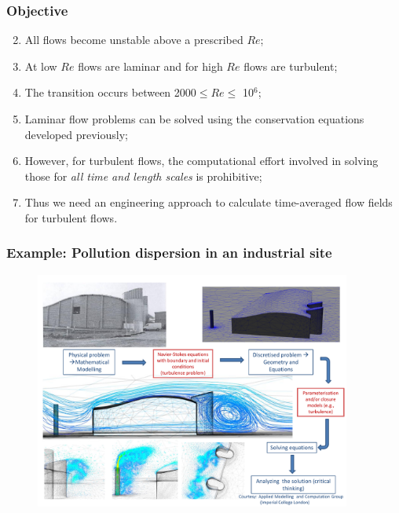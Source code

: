 \documentclass[10pt,compress,handout,ignorenonframetext]{beamer}
\begin{document}
\begin{frame}
 \frametitle{Objective}
     \begin{enumerate}\setcounter{enumi}{1}%
       \item<1-> All flows become unstable above a prescribed $Re$;
       \item<1-> At low $Re$ flows are laminar and for high $Re$ flows are turbulent;
       \item<1-> The transition occurs between 2000$\leq Re \leq$ 10$^{6}$;
       \item<2-> Laminar flow problems can be solved using the conservation equations developed previously;
       \item<2-> However, for turbulent flows, the computational effort involved in solving those for {\it all time and length scales} is prohibitive;
       \item<3-> Thus we need an engineering approach to calculate time-averaged flow fields for turbulent flows.
     \end{enumerate} 
\end{frame}

\begin{frame}
 \frametitle{Example: Pollution dispersion in an industrial site}

   \begin{figure}%
    \begin{center}
     \includegraphics[width=12.cm, height=7.8cm, clip]{./Figs/SpecificIndustrialEnvironmentalApplication.pdf}
    \end{center}
   \end{figure}    
\end{frame}


\end{document}

